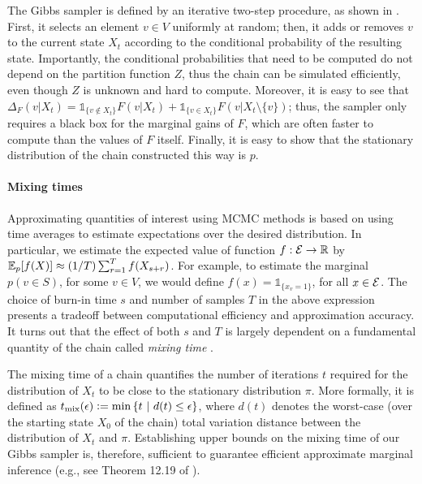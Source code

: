 The Gibbs sampler is defined by an iterative two-step procedure, as shown in .
First, it selects an element $v \in V$ uniformly at random; then, it adds or removes $v$ to the current state $X_t$ according to the conditional probability of the resulting state.
Importantly, the conditional probabilities that need to be computed do not depend on the partition function $Z$, thus the chain can be simulated efficiently, even though $Z$ is unknown and hard to compute.
Moreover, it is easy to see that $\Delta_F(v | X_t) = \mathds{1}_{\{v\not\in X_t\}}F(v|X_t) + \mathds{1}_{\{v\in X_t\}}F(v|X_t\setminus\{v\})$; thus, the sampler only requires a black box for the marginal gains of $F$, which are often faster to compute than the values of $F$ itself.
Finally, it is easy to show that the stationary distribution of the chain constructed this way is $p$.

\paragraph{Mixing times}
Approximating quantities of interest using MCMC methods is based on using time averages to estimate expectations over the desired distribution.
In particular, we estimate the expected value of function $f : \ss \to \mathbb{R}$ by $\E_p[f(X)] \approx (1/T)\sum_{r=1}^{T} f(X_{s + r})$.
For example, to estimate the marginal $p(v \in S)$, for some $v \in V$, we would define $f(x) = \mathds{1}_{\{x_v = 1\}}$, for all $x \in \ss$.
The choice of burn-in time $s$ and number of samples $T$ in the above expression presents a tradeoff between computational efficiency and approximation accuracy.
It turns out that the effect of both $s$ and $T$ is largely dependent on a fundamental quantity of the chain called \emph{mixing time} \cite{levin08}.

The mixing time of a chain quantifies the number of iterations $t$ required for the distribution of $X_t$ to be close to the stationary distribution $\pi$.
More formally, it is defined as $\tme \defeq \min \sdef{t}{d(t) \leq \epsilon}$, where $d(t)$ denotes the worst-case (over the starting state $X_0$ of the chain) total variation distance between the distribution of $X_t$ and $\pi$.
Establishing upper bounds on the mixing time of our Gibbs sampler is, therefore, sufficient to guarantee efficient approximate marginal inference (e.g., see Theorem 12.19 of \citet{levin08}).

